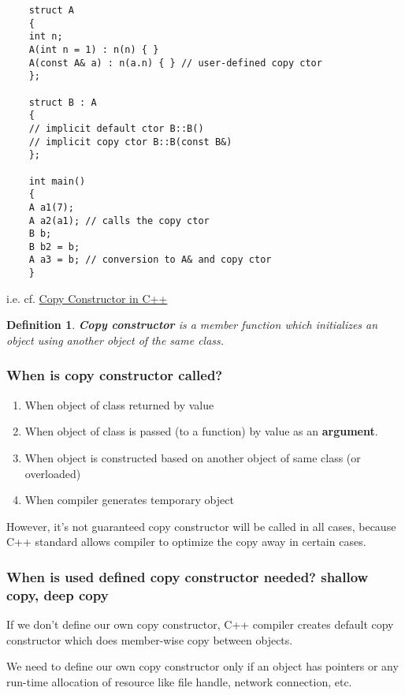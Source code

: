 \documentclass[10pt]{amsart}
\newtheorem{definition}{Definition}
\begin{document}
\begin{multicols*}{2}
	\begin{lstlisting}
	struct A
	{
	int n;
	A(int n = 1) : n(n) { }
	A(const A& a) : n(a.n) { } // user-defined copy ctor
	};
	
	struct B : A
	{
	// implicit default ctor B::B()
	// implicit copy ctor B::B(const B&)
	};
	
	int main()
	{
	A a1(7);
	A a2(a1); // calls the copy ctor
	B b;
	B b2 = b;
	A a3 = b; // conversion to A& and copy ctor  
	}
	\end{lstlisting}  

i.e. cf. \href{http://www.geeksforgeeks.org/copy-constructor-in-cpp/}{Copy Constructor in C++}

\begin{definition}
	\textbf{Copy constructor} is a member function which initializes an object using another object of the same class.  
\end{definition}

\subsubsection{When is copy constructor called? } 
\begin{enumerate}
	\item When object of class returned by value 
	\item When object of class is passed (to a function) by value as an \textbf{argument}.  
	\item When object is constructed based on another object of same class  (or overloaded)  
	\item When compiler generates temporary object  
\end{enumerate}


However, it's not guaranteed copy constructor will be called in all cases, because C++ standard allows compiler to optimize the copy away in certain cases.  

\subsubsection{When is used defined copy constructor needed?  shallow copy, deep copy}  

If we don't define our own copy constructor, C++ compiler creates default copy constructor which does member-wise copy between objects.  

We need to define our own copy constructor only if an object has pointers or any run-time allocation of resource like file handle, network connection, etc.  


\end{multicols*}
\end{document}
